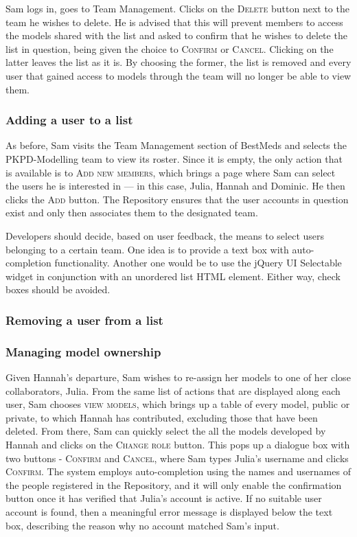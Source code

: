 Sam logs in, goes to Team Management. Clicks on the \textsc{Delete} button next to the team he wishes to delete. He is advised that this will prevent members to access the models shared with the list and asked to confirm that he wishes to delete the list in question, being given the choice to \textsc{Confirm} or \textsc{Cancel}. Clicking on the latter leaves the list as it is. By choosing the former, the list is removed and every user that gained access to models through the team will no longer be able to view them.

\subsubsection{Adding a user to a list}
As before, Sam visits the Team Management section of BestMeds and selects the PKPD-Modelling team to view its roster. Since it is empty, the only action that is available is to \textsc{Add new members}, which brings a page where Sam can select the users he is interested in --- in this case, Julia, Hannah and Dominic. He then clicks the \textsc{Add} button. The Repository ensures that the user accounts in question exist and only then associates them to the designated team.

\begin{techNote}
Developers should decide, based on user feedback, the means to select users belonging to a certain team. One idea is to provide a text box with auto-completion functionality. Another one would be to use the jQuery UI Selectable widget in conjunction with an unordered list HTML element. Either way, check boxes should be avoided.
\end{techNote}

\subsubsection{Removing a user from a list}

\subsubsection{Managing model ownership}
Given Hannah's departure, Sam wishes to re-assign her models to one of her close collaborators, Julia. From the same list of actions that are displayed along each user, Sam chooses \textsc{view models}, which brings up a table of every model, public or private, to which Hannah has contributed, excluding those that have been deleted. From there, Sam can quickly select the all the models developed by Hannah and clicks on the \textsc{Change role} button. This pops up a dialogue box with two buttons - \textsc{Confirm} and \textsc{Cancel}, where Sam types Julia's username and clicks \textsc{Confirm}. The system employs auto-completion using the names and usernames of the people registered in the Repository, and it will only enable the confirmation button once it has verified that Julia's account is active. If no suitable user account is found, then a meaningful error message is displayed below the text box, describing the reason why no account matched Sam's input. 

